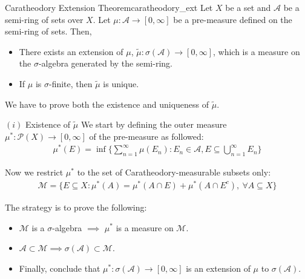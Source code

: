 \begin{theorem}{Caratheodory Extension Theorem}{caratheodory_ext}
    Let $X$ be a set and $\mathcal{A}$ be a semi-ring of sets over $X$. Let $\mu : \mathcal{A} \to [0,\infty]$ be a pre-measure defined on the semi-ring of sets. Then,
    \begin{itemize}
        \item There exists an extension of $\mu$, $\tilde\mu:\sigma(\mathcal{A}) \to [0, \infty]$, which is a measure on the $\sigma$-algebra generated by the semi-ring.
        \item If $\mu$ is $\sigma$-finite, then $\tilde\mu$ is unique.
    \end{itemize}
\end{theorem}

\begin{proof*}
    We have to prove both the existence and uniqueness of $\tilde\mu$.\newline 
    \begin{subproof}{$(i)$ Existence of $\tilde\mu$}
        We start by defining the outer measure $\mu^*:\mathcal{P}(X)\to [0,\infty]$ of the pre-measure as followed:
        \begin{align*}
            \mu^*(E) = \inf\Bigg\{ 
                \sum_{n=1}^\infty \mu(E_n) : E_n \in \mathcal{A}, E \subseteq \bigcup_{n=1}^\infty E_n
            \Bigg\}
        \end{align*}

        \noindent Now we restrict $\mu^*$ to the set of Caratheodory-measurable subsets only:
        \begin{align*}
            \mathcal{M} = \Bigg\{ E \subseteq X : \mu^*(A) = \mu^*(A\cap E) + \mu^*(A\cap E^c) , \ \forall A \subseteq X \Bigg\}
        \end{align*}

        \noindent \newline The strategy is to prove the following:
        \begin{itemize}
            \item $\mathcal{M}$ is a $\sigma$-algebra $\implies$ $\mu^*$ is a measure on $\mathcal{M}$.
            \item $\mathcal{A}\subset \mathcal{M} \implies \sigma(\mathcal{A}) \subset \mathcal{M}$.
            \item Finally, conclude that $\mu^*:\sigma(\mathcal{A})\to[0,\infty]$ is an extension of $\mu$ to $\sigma(\mathcal{A})$.
        \end{itemize}


\end{subproof}
\end{proof*}
